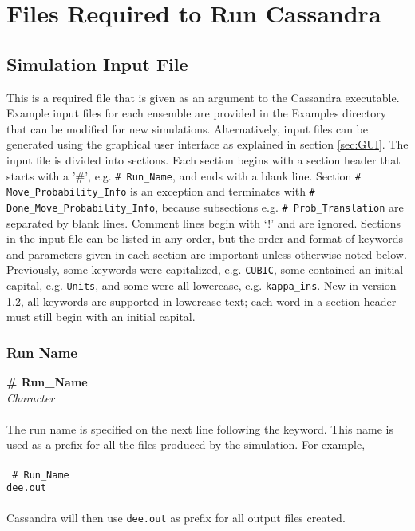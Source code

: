 \chapter{Files Required to Run Cassandra}
\label{ch:input_files}

\section{Simulation Input File} \label{sec:Input_File}
This is a required file that is given as an argument to the Cassandra executable. 
Example input files for each ensemble are provided in the Examples directory that can be
modified for new simulations.
Alternatively, input files can be generated using the graphical user interface as 
explained in section \ref{sec:GUI}.
The input file is divided into sections. 
Each section begins with a section header that starts with a '\#', 
e.g. {\tt\# Run\_Name}, and ends with a blank line.
Section {\tt\# Move\_Probability\_Info} is an exception and terminates with
{\tt\# Done\_Move\_Probability\_Info}, because subsections
e.g. {\tt\# Prob\_Translation} are separated by blank lines.
Comment lines begin with `!' and are ignored. 
Sections in the input file can be listed in any order, 
but the order and format of keywords and parameters given in each section 
are important unless otherwise noted below.
Previously, some keywords were capitalized, e.g. {\tt CUBIC}, 
some contained an initial capital, e.g. {\tt Units}, 
and some were all lowercase, e.g. {\tt kappa\_ins}.
New in version 1.2, all keywords are supported in lowercase text; 
each word in a section header must still begin with an initial capital.
%
%
%
\subsection{Run Name}\label{sec:Run_Name}
{\bf \# Run\_Name}\\
{\it Character} \\ \\
%
The run name is specified on the next line following the keyword. This name is used as a prefix for all the files
produced by the simulation. For example,\\ \\
%
{\tt{
\# Run\_Name \\
dee.out
}} \\ \\
%
Cassandra will then use \texttt{dee.out} as prefix for all output files created.

